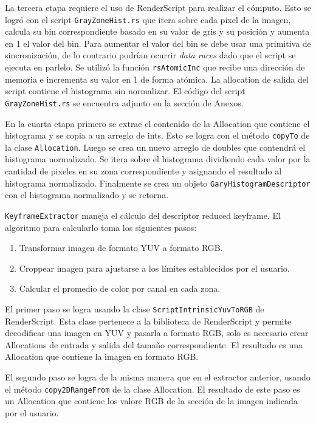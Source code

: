 La tercera etapa requiere el uso de RenderScript para realizar el cómputo. Esto se logró con el script \texttt{GrayZoneHist.rs} que itera sobre cada pixel de la imagen, calcula su bin correspondiente basado en su valor de gris y su posición y aumenta en 1 el valor del bin. Para aumentar el valor del bin se debe usar una primitiva de sincronización, de lo contrario podrían ocurrir \emph{data races} dado que el script se ejecuta en parlelo. Se utilizó la función \texttt{rsAtomicInc} que recibe una dirección de memoria e incrementa su valor en 1 de forma atómica. La allocation de salida del script contiene el histograma sin normalizar. El código del script \texttt{GrayZoneHist.rs} se encuentra adjunto en la sección de Anexos.

En la cuarta etapa primero se extrae el contenido de la Allocation que contiene el histograma y se copia a un arreglo de ints. Esto se logra con el método \texttt{copyTo} de la clase \texttt{Allocation}. Luego se crea un nuevo arreglo de doubles que contendrá el histograma normalizado. Se itera sobre el histograma dividiendo cada valor por la cantidad de pixeles en su zona correspondiente y asignando el resultado al histograma normalizado. Finalmente se crea un objeto \texttt{GaryHistogramDescriptor} con el histograma normalizado y se retorna.

\texttt{KeyframeExtractor} maneja el cálculo del descriptor reduced keyframe. El algoritmo para calcularlo toma los siguientes pasos:
\begin{enumerate}
\item Transformar imagen de formato YUV a formato RGB.
\item Croppear imagen para ajustarse a los límites establecidos por el usuario.
\item Calcular el promedio de color por canal en cada zona.
\end{enumerate}

El primer paso se logra usando la clase \texttt{ScriptIntrinsicYuvToRGB} de RenderScript. Esta clase pertenece a la biblioteca de RenderScript y permite decodificar una imagen en YUV y pasarla a formato RGB, solo es necesario crear Allocations de entrada y salida del tamaño correspondiente. El resultado es una Allocation que contiene la imagen en formato RGB.

El segundo paso se logra de la misma manera que en el extractor anterior, usando el método \texttt{copy2DRangeFrom} de la clase Allocation. El resultado de este paso es un Allocation que contiene los valore RGB de la sección de la imagen indicada por el usuario.

